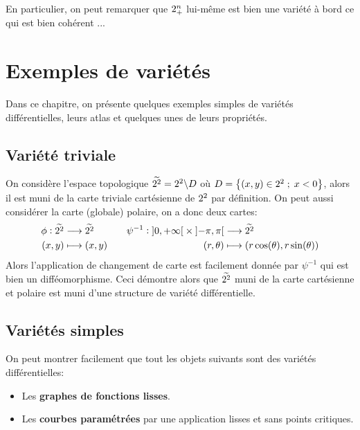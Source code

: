    En particulier, on peut remarquer que \( 2^n_+ \) lui-même est bien une variété à bord ce qui est bien cohérent ...
\chapter{Exemples de variétés}
   Dans ce chapitre, on présente quelques exemples simples de variétés différentielles, leurs atlas et quelques unes de leurs propriétés.
   \section{Variété triviale}
   On considère l'espace topologique \( \widetilde{2^2} = 2^2 \backslash D\) où \(D = \left\{ (x, y) \in 2^2 \; ; \; x < 0 \right\}\), alors il est muni de la carte triviale cartésienne de \( 2^2 \) par définition. On peut aussi considérer la carte (globale) polaire, on a donc deux cartes:
   \[ 
      \begin{aligned}
         \phi : \widetilde{\R^2} &\longrightarrow \widetilde{\R^2} \\
         (x, y) &\longmapsto (x, y)
      \end{aligned} \quad\quad
      \begin{aligned}
         \psi^{-1} : \ioo{0}{+\infty} \times \ioo{-\pi}{\pi} &\longrightarrow \widetilde{\R^2} \\
         (r, \theta) &\longmapsto (r \cos( \theta), r \sin( \theta))
      \end{aligned}
   \]
   Alors l'application de changement de carte est facilement donnée par \( \psi^{-1} \) qui est bien un difféomorphisme. Ceci démontre alors que \( \widetilde{2^2} \) muni de la carte cartésienne et polaire est muni d'une structure de variété différentielle. 
   \section{Variétés simples}
   On peut montrer facilement que tout les objets suivants sont des variétés différentielles:
   \begin{itemize}
      \item Les \textbf{graphes de fonctions lisses}.
      \item Les \textbf{courbes paramétrées} par une application lisses et sans points critiques.
   \end{itemize}
